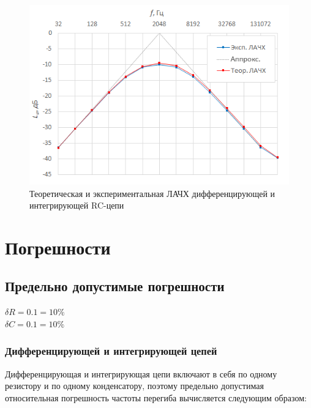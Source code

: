 \setlength{\belowcaptionskip}{0pt} %
\begin{figure}[H]
	\begin{center}
		\includegraphics[width=15cm]{img/3}
		\caption{Теоретическая и экспериментальная ЛАЧХ дифференцирующей и интегрирующей RC-цепи} 
		\label{t:e3} %
	\end{center}
\end{figure}

\section{Погрешности}

\subsection{Предельно допустимые погрешности}
\begin{center}
$\delta R = 0.1 = 10\%$\\
$\delta C = 0.1 = 10\%$\\
\end{center}

\subsubsection{Дифференцирующей и интегрирующей цепей}

Дифференцирующая и интегрирующая цепи включают в себя по одному резистору и по одному конденсатору, поэтому предельно допустимая относительная погрешность частоты перегиба вычисляется следующим образом:\\

